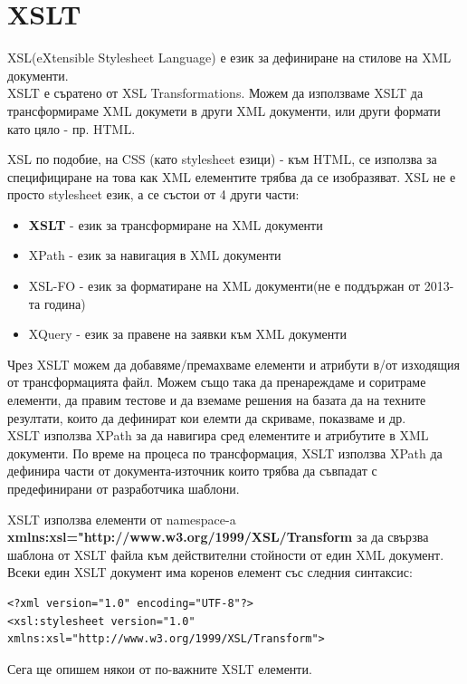\documentclass[11pt]{article} %
\begin{document}
\section{XSLT}
XSL(eXtensible Stylesheet Language) е език за дефиниране на стилове на XML документи.\\
XSLT е съратено от XSL Transformations. Можем да използваме XSLT да трансформираме XML докумети в други XML документи, или други формати като цяло - пр. HTML.\\\par
XSL по подобие, на CSS (като stylesheet езици) - към HTML, се използва за специфициране на това как XML елементите трябва да се изобразяват. XSL не е просто stylesheet език, а се състои от 4 други части:\\
\begin{itemize}[noitemsep]
	\item \textbf{XSLT} - език за трансформиране на XML документи
	\item XPath - език за навигация в XML документи
	\item XSL-FO - език за форматиране на XML документи(не е поддържан от 2013-та година)
	\item XQuery - език за правене на заявки към XML документи \\
\end{itemize}

Чрез XSLT можем да добавяме/премахваме елементи и атрибути в/от изходящия от трансформацията файл. Можем също така да пренареждаме и соритраме елементи, да правим тестове и да вземаме решения на базата да на техните резултати, които да дефинират кои елемти да скриваме, показваме и др. \\
XSLT използва XPath за да навигира сред елементите и атрибутите в XML документи. По време на процеса по трансформация, XSLT използва XPath да дефинира части от документа-източник които трябва да съвпадат с предефинирани от разработчика шаблони.\\\par
XSLT използва елементи от namespace-a \textbf{xmlns:xsl="http://www.w3.org/1999/XSL/Transform} за да свързва шаблона от XSLT файла към действителни стойности от един XML документ.\\
Всеки един XSLT документ има коренов елемент със следния синтаксис:\\
\begin{verbatim}
<?xml version="1.0" encoding="UTF-8"?>
<xsl:stylesheet version="1.0"
xmlns:xsl="http://www.w3.org/1999/XSL/Transform">
\end{verbatim}
Сега ще опишем някои от по-важните XSLT елементи.
\end{document}
